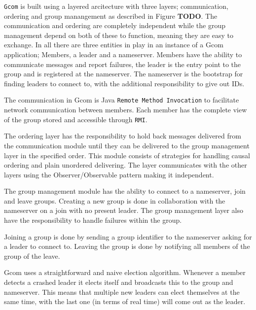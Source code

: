 	\texttt{Gcom} is built using a layered arcitecture with three layers; communication, ordering and group manangement as described in Figure \textbf{TODO}.
	The communication and ordering are completely independent while the group management depend on both of these to function, meaning they are easy to exchange.
	In all there are three entities in play in an instance of a Gcom application; Members, a leader and a nameserver.
	Members have the ability to communicate messages and report failures, the leader is the entry point to the group and is registered at the nameserver.
	The nameserver is the bootstrap for finding leaders to connect to, with the additional responsibility to give out IDs.

	The communication in Gcom is Java \texttt{Remote Method Invocation} to facilitate network communication between members.
	Each member has the complete view of the group stored and accessible through \texttt{RMI}.








	

	The ordering layer has the responsibility to hold back messages delivered from the communication module until they can be delivered to the group management layer in the specified order.
	This module consists of strategies for handling causal ordering and plain unordered delivering.
	The layer communicates with the other layers using the Observer/Observable pattern making it independent.



	The group management module has the ability to connect to a nameserver, join and leave groups.
	Creating a new group is done in collaboration with the nameserver on a join with no present leader.
	The group management layer also have the responsibility to handle failures within the group.


	Joining a group is done by sending a group identifier to the nameserver asking for a leader to connect to.
	Leaving the group is done by notifying all members of the group of the leave.


		Gcom uses a straightforward and naive election algorithm.
		Whenever a member detects a crashed leader it elects itself and broadcasts this to the group and nameserver.
		This means that multiple new leaders can elect themselves at the same time, with the last one (in terms of real time) will come out as the leader.


